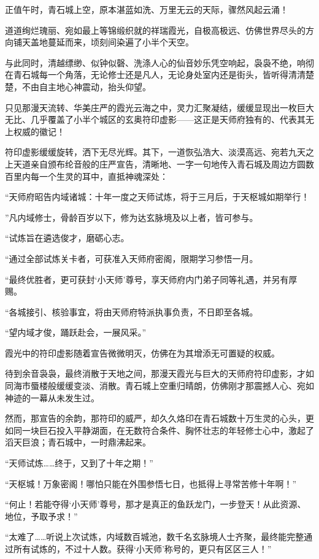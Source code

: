 正值午时，青石城上空，原本湛蓝如洗、万里无云的天际，骤然风起云涌！

道道绚烂瑰丽、宛如最上等锦缎织就的祥瑞霞光，自极高极远、仿佛世界尽头的方向铺天盖地蔓延而来，顷刻间染遍了小半个天空。

与此同时，清越缥缈、似钟似磬、洗涤人心的仙音妙乐凭空响起，袅袅不绝，响彻在青石城每一个角落，无论修士还是凡人，无论身处室内还是街头，皆听得清清楚楚，不由自主地心神震动，抬头仰望。

只见那漫天流转、华美庄严的霞光云海之中，灵力汇聚凝结，缓缓显现出一枚巨大无比、几乎覆盖了小半个城区的玄奥符印虚影——这正是天师府独有的、代表其无上权威的徽记！

符印虚影缓缓旋转，洒下无尽光辉。其下，一道恢弘浩大、淡漠高远、宛若九天之上天道亲自颁布纶音般的庄严宣告，清晰地、一字一句地传入青石城及周边方圆数百里内每一个生灵的耳中，直抵神魂深处：

“天师府昭告内域诸城：十年一度之天师试炼，将于三月后，于天枢城如期举行！

”凡内域修士，骨龄百岁以下，修为达玄脉境及以上者，皆可参与。

“试炼旨在遴选俊才，磨砺心志。

“通过全部试炼关卡者，可获准入天师府密阁，限期学习参悟一月。

“最终优胜者，更可获封‘小天师’尊号，享天师府内门弟子同等礼遇，并另有厚赐。

“各城接引、核验事宜，将由天师府特派执事负责，不日即至各城。

“望内域才俊，踊跃赴会，一展风采。”

霞光中的符印虚影随着宣告微微明灭，仿佛在为其增添无可置疑的权威。

待到余音袅袅，最终消散于天地之间，那漫天霞光与巨大的天师府符印虚影，才如同海市蜃楼般缓缓变淡、消散。青石城上空重归晴朗，仿佛刚才那震撼人心、宛如神迹的一幕从未发生过。

然而，那宣告的余韵，那符印的威严，却久久烙印在青石城数十万生灵的心头，更如同一块巨石投入平静湖面，在无数符合条件、胸怀壮志的年轻修士心中，激起了滔天巨浪；青石城中，一时鼎沸起来。

“天师试炼……终于，又到了十年之期！”

“天枢城！万象密阁！哪怕只能在外围参悟七日，也抵得上寻常苦修十年啊！”

“何止！若能夺得‘小天师’尊号，那才是真正的鱼跃龙门，一步登天！从此资源、地位，予取予求！”

“太难了……听说上次试炼，内域数百城池，数千名玄脉境人士齐聚，最终能完整通过所有试炼的，不过十人数。获得‘小天师’称号的，更只有区区三人！”

